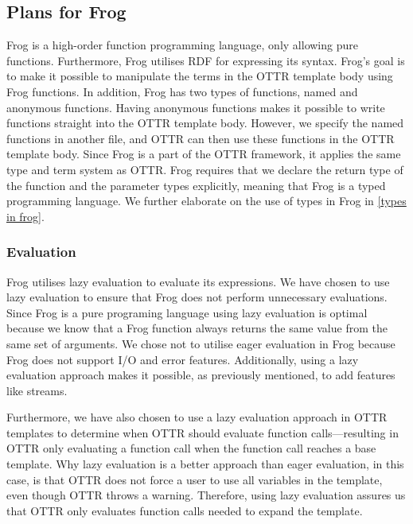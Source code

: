 \subsection{Plans for Frog}
Frog is a high-order function programming language, only allowing pure functions. Furthermore, Frog utilises RDF for expressing its syntax. Frog's goal is to make it possible to manipulate the terms in the OTTR template body using Frog functions. In addition, Frog has two types of functions, named and anonymous functions. Having anonymous functions makes it possible to write functions straight into the OTTR template body. However, we specify the named functions in another file, and OTTR can then use these functions in the OTTR template body. Since Frog is a part of the OTTR framework, it applies the same type and term system as OTTR. Frog requires that we declare the return type of the function and the parameter types explicitly, meaning that Frog is a typed programming language. We further elaborate on the use of types in Frog in \autoref{types in frog}.


\subsubsection{Evaluation}
\label{frog_evaluation}
Frog utilises lazy evaluation to evaluate its expressions. We have chosen to use lazy evaluation to ensure that Frog does not perform unnecessary evaluations. Since Frog is a pure programing language using lazy evaluation is optimal because we know that a Frog function always returns the same value from the same set of arguments. We chose not to utilise eager evaluation in Frog because Frog does not support I/O and error features. Additionally, using a lazy evaluation approach makes it possible, as previously mentioned, to add features like streams.

\para
Furthermore, we have also chosen to use a lazy evaluation approach in OTTR templates to determine when OTTR should evaluate function calls—resulting in OTTR only evaluating a function call when the function call reaches a base template. Why lazy evaluation is a better approach than eager evaluation, in this case, is that OTTR does not force a user to use all variables in the template, even though OTTR throws a warning. Therefore, using lazy evaluation assures us that OTTR only evaluates function calls needed to expand the template.  

